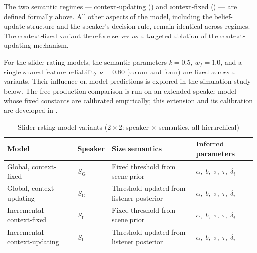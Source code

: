 \documentclass[man,floatsintext]{apa7}
\begin{document}
The two semantic regimes --- context-updating () and context-fixed () --- are defined formally above.
All other aspects of the model, including the belief-update structure and the speaker's decision rule, remain identical across regimes.
The context-fixed variant therefore serves as a targeted ablation of the context-updating mechanism.

For the slider-rating models, the semantic parameters $k = 0.5$, $w_f = 1.0$, and a single shared feature reliability $\nu = 0.80$ (colour and form) are fixed across all variants.
Their influence on model predictions is explored in the simulation study below.
The free-production comparison is run on an extended speaker model whose fixed constants are calibrated empirically; this extension and its calibration are developed in .

\begin{table}[htbp]
  \caption{Slider-rating model variants ($2 \times 2$: speaker $\times$ semantics, all hierarchical)}
  \label{tab:slider-models}
  \centering
  \begin{tabularx}{\textwidth}{llXl}
    \toprule
    \textbf{Model} & \textbf{Speaker} & \textbf{Size semantics} & \textbf{Inferred parameters} \\
    \midrule
    Global, context-fixed & $S_\text{G}$ & Fixed threshold from scene prior & $\alpha,\; b,\; \sigma,\; \tau,\; \delta_i$ \\
    Global, context-updating & $S_\text{G}$ & Threshold updated from listener posterior & $\alpha,\; b,\; \sigma,\; \tau,\; \delta_i$ \\
    Incremental, context-fixed & $S_\text{I}$ & Fixed threshold from scene prior & $\alpha,\; b,\; \sigma,\; \tau,\; \delta_i$ \\
    Incremental, context-updating & $S_\text{I}$ & Threshold updated from listener posterior & $\alpha,\; b,\; \sigma,\; \tau,\; \delta_i$ \\
    \bottomrule
  \end{tabularx}
\end{table}
\end{document}
